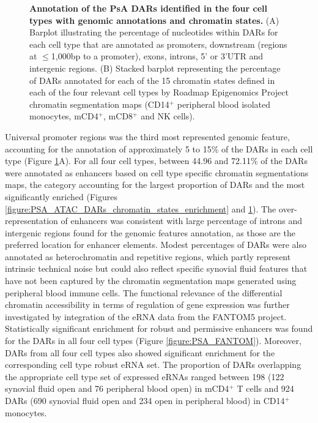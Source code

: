 \begin{figure}[htbp]
\begin{subfigure}[b]{0.75\textwidth}
\caption{}
\end{subfigure}
\caption[Annotation of the PsA DARs identified in the four cell types with genomic annotations and chromatin states.]{\textbf{Annotation of the PsA DARs identified in the four cell types with genomic annotations and chromatin states.} (A) Barplot illustrating the percentage of nucleotides within DARs for each cell type that are annotated as promoters, downstream (regions at $\leq$1,000bp to a promoter), exons, introns, 5' or 3'UTR and intergenic regions. (B) Stacked barplot representing the percentage of DARs annotated for each of the 15 chromatin states defined in each of the four relevant cell types by Roadmap Epigenomics Project chromatin segmentation maps (CD14$^+$ peripheral blood isolated monocytes, mCD4$^+$, mCD8$^+$ and NK cells).}
\label{figure:PsA_FAST_ATAC_DOCS_annotation}
\end{figure}

Universal promoter regions was the third most represented genomic feature, accounting for the annotation of approximately 5 to 15\% of the DARs in each cell type (Figure \ref{figure:PsA_FAST_ATAC_DOCS_annotation}A). For all four cell types, between 44.96 and 72.11\% of the DARs were annotated as enhancers based on cell type specific chromatin segmentations maps, the category accounting for the largest proportion of DARs and the most significantly enriched (Figures \ref{figure:PSA_ATAC_DARs_chromatin_states_enrichment} and \ref{figure:PsA_FAST_ATAC_DOCS_annotation}). The over-representation of enhancers was consistent with large percentage of introns and intergenic regions found for the genomic features annotation, as those are the preferred location for enhancer elements. Modest percentages of DARs were also annotated as heterochromatin and repetitive regions, which partly represent intrinsic technical noise but could also reflect specific synovial fluid features that have not been captured by the chromatin segmentation maps generated using peripheral blood immune cells.
%
The functional relevance of the differential chromatin accessibility in terms of regulation of gene expression was further investigated by integration of the eRNA data from the FANTOM5 project. Statistically significant enrichment for robust and permissive enhancers was found for the DARs in all four cell types (Figure \ref{figure:PSA_FANTOM}).  Moreover, DARs from all four cell types also showed significant enrichment for the corresponding cell type robust eRNA set. The proportion of DARs overlapping the appropriate cell type set of expressed eRNAs ranged between 198 (122 synovial fluid open and 76 peripheral blood open) in mCD4$^+$ T cells and 924 DARs (690 synovial fluid open and 234 open in peripheral blood) in CD14$^+$ monocytes.


